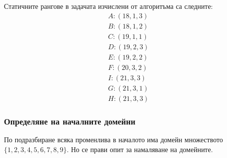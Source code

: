 \documentclass[a4paper, 12pt]{article}
\begin{document}
Статичните рангове в задачата изчислени от алгоритъма са следните:
\begin{align*}
    A : (18, 1, 3) \\
    B : (18, 1, 2) \\
    C : (19, 1, 1) \\
    D : (19, 2, 3) \\
    E : (19, 2, 2) \\
    F : (20, 3, 2) \\
    I : (21, 3, 3) \\
    G : (21, 3, 1) \\
    H : (21, 3, 3)
\end{align*}
\subsubsection{Определяне на началните домейни}
По подразбиране всяка променлива в началото има домейн множеството \(\{1, 2, 3, 4, 5, 6, 7, 8, 9\}\).
Но се прави опит за намаляване на домейните.
\end{document}
